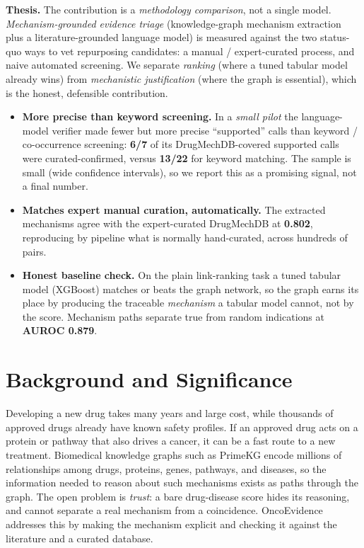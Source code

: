 \documentclass[11pt]{article}
\begin{document}
\begin{winbox}
\textbf{Thesis.} The contribution is a \emph{methodology comparison}, not a single
model. \emph{Mechanism-grounded evidence triage} (knowledge-graph mechanism
extraction plus a literature-grounded language model) is measured against the two
status-quo ways to vet repurposing candidates: a manual / expert-curated process,
and naive automated screening. We separate \emph{ranking} (where a tuned tabular
model already wins) from \emph{mechanistic justification} (where the graph is
essential), which is the honest, defensible contribution.
\begin{itemize}[leftmargin=1.3em,itemsep=1pt,topsep=2pt]
\item \textbf{More precise than keyword screening.} In a \emph{small pilot} the
language-model verifier made fewer but more precise ``supported'' calls than
keyword / co-occurrence screening: \textbf{6/7} of its DrugMechDB-covered supported
calls were curated-confirmed, versus \textbf{13/22} for keyword matching. The sample
is small (wide confidence intervals), so we report this as a promising signal, not a
final number.
\item \textbf{Matches expert manual curation, automatically.} The extracted
mechanisms agree with the expert-curated DrugMechDB at \textbf{0.802}, reproducing
by pipeline what is normally hand-curated, across hundreds of pairs.
\item \textbf{Honest baseline check.} On the plain link-ranking task a tuned tabular
model (XGBoost) matches or beats the graph network, so the graph earns its place by
producing the traceable \emph{mechanism} a tabular model cannot, not by the score.
Mechanism paths separate true from random indications at \textbf{AUROC 0.879}.
\end{itemize}
\end{winbox}

\section{Background and Significance}

Developing a new drug takes many years and large cost, while thousands of approved
drugs already have known safety profiles. If an approved drug acts on a protein or
pathway that also drives a cancer, it can be a fast route to a new treatment.
Biomedical knowledge graphs such as PrimeKG encode millions of relationships among
drugs, proteins, genes, pathways, and diseases, so the information needed to reason
about such mechanisms exists as paths through the graph. The open problem is
\emph{trust}: a bare drug-disease score hides its reasoning, and cannot separate a
real mechanism from a coincidence. OncoEvidence addresses this by making the
mechanism explicit and checking it against the literature and a curated database.
\end{document}
